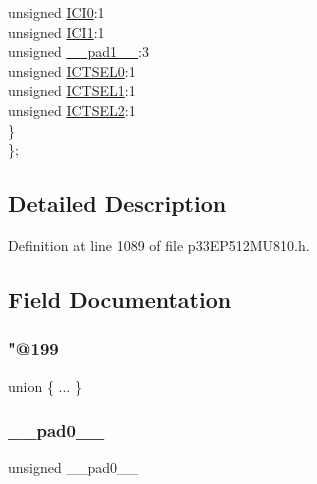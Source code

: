 \begin{DoxyCompactItemize}
\begin{tabbing}
\>\>unsigned \hyperlink{structtag_i_c11_c_o_n1_b_i_t_s_a6f1b5da2706b7c15fc8c9a01a30deaff}{ICI0}:1\\
\>\>unsigned \hyperlink{structtag_i_c11_c_o_n1_b_i_t_s_a7d5c777f0bc43f66f40462f79ed2179c}{ICI1}:1\\
\>\>unsigned \hyperlink{structtag_i_c11_c_o_n1_b_i_t_s_acaf2d0924a107ec6e8d2e31febaf66f9}{\_\_pad1\_\_}:3\\
\>\>unsigned \hyperlink{structtag_i_c11_c_o_n1_b_i_t_s_af6dd4d0e816b18462680d4b22fa926d3}{ICTSEL0}:1\\
\>\>unsigned \hyperlink{structtag_i_c11_c_o_n1_b_i_t_s_aa29140e739d886362537f87d199c4134}{ICTSEL1}:1\\
\>\>unsigned \hyperlink{structtag_i_c11_c_o_n1_b_i_t_s_a47d80892d449e6edbd5ba2ba9ff06deb}{ICTSEL2}:1\\
\>\} \\
\}; \\

\end{tabbing}\end{DoxyCompactItemize}


\subsection{Detailed Description}


Definition at line 1089 of file p33\+E\+P512\+M\+U810.\+h.



\subsection{Field Documentation}
\mbox{\label{structtag_i_c11_c_o_n1_b_i_t_s_a678dc219d147facf08294f5b179df90d}} 
\subsubsection{\texorpdfstring{"@199}{@199}}
{\footnotesize\ttfamily union \{ ... \} }

\mbox{\label{structtag_i_c11_c_o_n1_b_i_t_s_adf71f3d8410c1f1dbbc96680a92c49af}} 
\subsubsection{\texorpdfstring{\+\_\+\+\_\+pad0\+\_\+\+\_\+}{\_\_pad0\_\_}}
{\footnotesize\ttfamily unsigned \+\_\+\+\_\+pad0\+\_\+\+\_\+}



